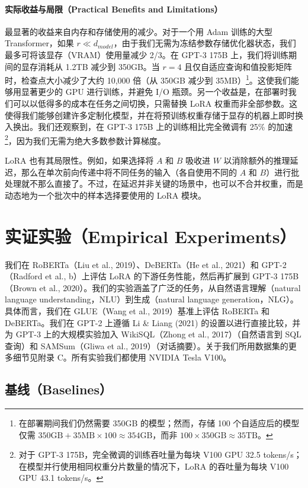 \documentclass[11pt,UTF8,fontset=fandol]{ctexart}
\begin{document}
\paragraph{实际收益与局限（Practical Benefits and Limitations）}最显著的收益来自内存和存储使用的减少。对于一个用 Adam 训练的大型 Transformer，如果 $r\ll d_{model}$，由于我们无需为冻结参数存储优化器状态，我们最多可将该显存（VRAM）使用量减少 2/3。在 GPT-3 175B 上，我们将训练期间的显存消耗从 1.2TB 减少到 350GB。当 $r=4$ 且仅自适应查询和值投影矩阵时，检查点大小减少了大约 10{,}000 倍（从 350GB 减少到 35MB）\footnote{在部署期间我们仍然需要 350GB 的模型；然而，存储 100 个自适应后的模型仅需 $350\text{GB}+35\text{MB}\times100\approx354\text{GB}$，而非 $100\times350\text{GB}\approx35\text{TB}$。}。这使我们能够用显著更少的 GPU 进行训练，并避免 I/O 瓶颈。另一个收益是，在部署时我们可以以低得多的成本在任务之间切换，只需替换 LoRA 权重而非全部参数。这使得我们能够创建许多定制化模型，并在将预训练权重存储于显存的机器上即时换入换出。我们还观察到，在 GPT-3 175B 上的训练相比完全微调有 25\% 的加速\footnote{对于 GPT-3 175B，完全微调的训练吞吐量为每块 V100 GPU 32.5 tokens/s；在模型并行使用相同权重分片数量的情况下，LoRA 的吞吐量为每块 V100 GPU 43.1 tokens/s。}，因为我们无需为绝大多数参数计算梯度。

LoRA 也有其局限性。例如，如果选择将 $A$ 和 $B$ 吸收进 $W$ 以消除额外的推理延迟，那么在单次前向传递中将不同任务的输入（各自使用不同的 $A$ 和 $B$）进行批处理就不那么直接了。不过，在延迟并非关键的场景中，也可以不合并权重，而是动态地为一个批次中的样本选择要使用的 LoRA 模块。

\section{实证实验（Empirical Experiments）}

我们在 RoBERTa（Liu et al., 2019）、DeBERTa（He et al., 2021）和 GPT-2（Radford et al., b）上评估 LoRA 的下游任务性能，然后再扩展到 GPT-3 175B（Brown et al., 2020）。我们的实验涵盖了广泛的任务，从自然语言理解（natural language understanding，NLU）到生成（natural language generation，NLG）。具体而言，我们在 GLUE（Wang et al., 2019）基准上评估 RoBERTa 和 DeBERTa。我们在 GPT-2 上遵循 Li \& Liang (2021) 的设置以进行直接比较，并为 GPT-3 上的大规模实验加入 WikiSQL（Zhong et al., 2017）（自然语言到 SQL 查询）和 SAMSum（Gliwa et al., 2019）（对话摘要）。关于我们所用数据集的更多细节见附录 C。所有实验我们都使用 NVIDIA Tesla V100。

\subsection{基线（Baselines）}
\end{document}
